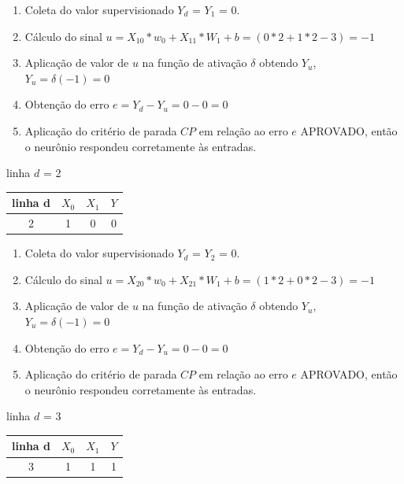 \documentclass[	12pt, Times, openright, twoside, a4paper, english, brazil]{abntex2}
\begin{document}
            	\begin{enumerate}
            	    \item Coleta do valor supervisionado $Y_d$ = $Y_1$ = 0.
            		\item Cálculo do sinal $u = X_{10}*w_0 + X_{11}*W_1 +b  = (0*2 + 1*2 -3) = -1$
            		\item Aplicação de valor de $u$ na função de ativação $\delta$ obtendo $Y_u$, $Y_u = \delta(-1) = 0$
            		\item Obtenção do erro $e = Y_d-Y_u = 0 - 0 = 0$
            		\item Aplicação do critério de parada $CP$ em relação ao erro $e$ APROVADO, então o neurônio respondeu corretamente às entradas.
            	\end{enumerate}
            
            	linha $d$ = 2\\
            	    \begin{table}[!ht]
                    \centering
    				\begin{tabular}{|c|c|c|c|}
    					\hline  \textbf{linha d} & \textbf{$X_0$} & \textbf{$X_1$} &  \textbf{$Y$}\\
  				 	    \hline 2 & 1 & 0 & 0\\ \hline
    				\end{tabular}
    				\end{table}
    				
            	\begin{enumerate}
            	    \item Coleta do valor supervisionado $Y_d$ = $Y_2$ = 0.
            		\item Cálculo do sinal $u = X_{20}*w_0 + X_{21}*W_1 +b  = (1*2 + 0*2 -3) = -1$
            		\item Aplicação de valor de $u$ na função de ativação $\delta$ obtendo $Y_u$, $Y_u = \delta(-1) = 0$
            		\item Obtenção do erro $e = Y_d-Y_u = 0 - 0 = 0$
            		\item Aplicação do critério de parada $CP$ em relação ao erro $e$ APROVADO, então o neurônio respondeu corretamente às entradas.
            	\end{enumerate}
            
            	linha $d$ = 3\\
            	    \begin{table}[!ht]
                    \centering
    				\begin{tabular}{|c|c|c|c|}
    					\hline  \textbf{linha d} & \textbf{$X_0$} & \textbf{$X_1$} &  \textbf{$Y$}\\
  				 	    \hline 3 & 1 & 1 & 1\\ \hline
    				\end{tabular}
    				\end{table}
    				
\end{document}
